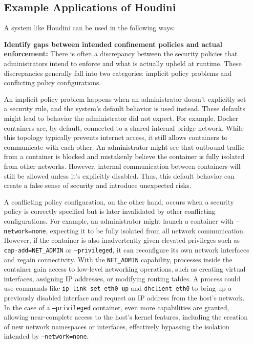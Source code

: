 \documentclass[12pt]{report}
\begin{document}
\begin{doublespace}
\subsection{Example Applications of Houdini}
A system like Houdini can be used in the following ways: 

\noindent\textbf{Identify gaps between intended confinement policies and actual enforcement:}
There is often a discrepancy between the security policies that administrators intend to enforce and what is actually upheld at runtime. These discrepancies generally fall into two categories: implicit policy problems and conflicting policy configurations.

An implicit policy problem happens when an administrator doesn't explicitly set a security rule, and the system's default behavior is used instead. These defaults might lead to behavior the administrator did not expect. For example, Docker containers are, by default, connected to a shared internal bridge network. While this topology typically prevents internet access, it still allows containers to communicate with each other. An administrator might see that outbound traffic from a container is blocked and mistakenly believe the container is fully isolated from other networks. However, internal communication between containers will still be allowed unless it's explicitly disabled. Thus, this default behavior can create a false sense of security and introduce unexpected risks.

A conflicting policy configuration, on the other hand, occurs when a security policy is correctly specified but is later invalidated by other conflicting configurations. For example, an administrator might launch a container with \texttt{--network=none}, expecting it to be fully isolated from all network communication. However, if the container is also inadvertently given elevated privileges such as \texttt{--cap-add=NET\_ADMIN} or \texttt{--privileged}, it can reconfigure its own network interfaces and regain connectivity. With the \texttt{NET\_ADMIN} capability, processes inside the container gain access to low-level networking operations, such as creating virtual interfaces, assigning IP addresses, or modifying routing tables. A process could use commands like \texttt{ip link set eth0 up} and \texttt{dhclient eth0} to bring up a previously disabled interface and request an IP address from the host’s network. In the case of a \texttt{--privileged} container, even more capabilities are granted, allowing near-complete access to the host's kernel features, including the creation of new network namespaces or interfaces, effectively bypassing the isolation intended by \texttt{--network=none}.


\end{doublespace}
\end{document}
